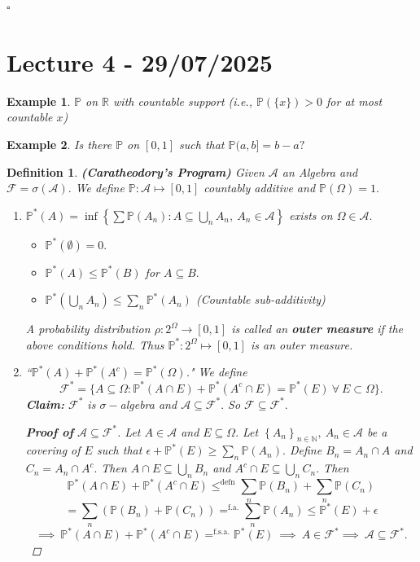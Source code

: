 \documentclass{article}
\newcommand{\1}{\mathds{1}}
\newcommand{\R}{\mathbb{R}}
\newcommand{\N}{\mathbb{N}}
\newcommand{\F}{\mathcal{F}}
\newcommand{\PB}{\mathbb{P}}
\newcommand{\A}{\mathcal{A}}
\newcommand{\lf}{\left}
\newcommand{\rg}{\right}
\newcommand{\en}[3]{\lf\{{#1}_{#2}\rg\}_{#2\in #3}}
\newtheorem{definition}[theorem]{Definition}
\newtheorem{example}{Example}
\begin{document}
$\square$
\section{Lecture 4 - 29/07/2025}
\begin{example}
$\PB$ on $\R$ with countable support (i.e., $\PB(\{x\})>0$ for at most countable $x$)
\end{example}
\begin{example}
    Is there $\PB$ on $[0,1]$ such that $\PB(a,b]=b-a?$
\end{example}
\begin{definition}\textbf{(Caratheodory's Program)}
   Given $\A$ an Algebra and $\F=\sigma(\A).$ We define $\PB:\A\mapsto [0,1]$ countably additive and $\PB(\Omega)=1.$
   \begin{enumerate}
       \item $\PB^*(A)=\inf\lf\{\sum \PB(A_n):A\subseteq \bigcup_n A_n,\ A_n\in \A\rg\}$ exists on $\Omega\in\A.$
       \begin{itemize}
           \item $\PB^*(\emptyset)=0.$
           \item $\PB^*(A)\leq \PB^*(B)$ for $A\subseteq B.$
           \item $\PB^*(\bigcup_n A_n)\leq \sum_n \PB^*(A_n)$ (Countable sub-additivity)
       \end{itemize}
       A probability distribution $\rho:2^\Omega\to [0,1]$ is called an \textbf{outer measure} if the above conditions hold. Thus $\PB^*:2^\Omega\mapsto [0,1]$ is an outer measure.
       \item ``$\PB^*(A)+\PB^*(A^c)=\PB^*(\Omega)$." We define $$\F^*=\{A\subseteq\Omega:\PB^*(A\cap E)+\PB^*(A^c\cap E)=\PB^*(E)\ \forall\ E\subset\Omega\}.$$
       \textbf{Claim:} $\F^*$ is $\sigma-$algebra and $\A\subseteq\F^*.$ So $\F\subseteq\F^*.$
       \begin{proof}[\textbf{Proof of} $\mathbf{\A\subseteq \F^*}$] Let $A\in\A$ and $E\subseteq\Omega.$ Let $\en An\N,\ A_n\in\A$ be a covering of $E$ such that $\epsilon+\PB^*(E)\geq \sum_n \PB(A_n).$ Define $B_n=A_n\cap A$ and $C_n=A_n\cap A^c.$ Then $A\cap E\subseteq \bigcup_n B_n$ and $A^c\cap E\subseteq \bigcup_n C_n.$ Then $$\PB^*(A\cap E)+\PB^*(A^c\cap E)\leq^\text{defn} \sum_n\PB(B_n)+\sum_n\PB(C_n)$$ $$=\sum_n (\PB(B_n)+\PB(C_n))=^\text{f.a.}\sum_n \PB(A_n)\leq \PB^*(E)+\epsilon$$ $$\implies\ \PB^*(A\cap E)+\PB^*(A^c\cap E)=^\text{f.s.a.} \PB^*(E)\ \implies\ A\in\F^*\implies\ \A\subseteq\F^*.$$
       \end{proof}

\end{enumerate}
\end{definition}
\end{document}
